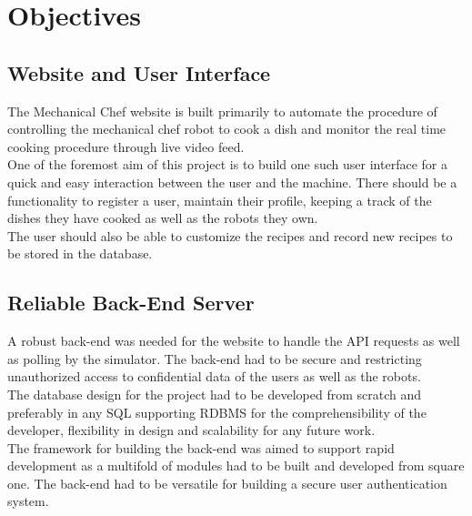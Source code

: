 
\chapter{Objectives}

\section{ Website and User Interface}
{\normalsize The Mechanical Chef website is built primarily to automate the procedure of controlling the mechanical chef robot to cook a dish and monitor the real time cooking procedure through live video feed.\\[0.1in]
One of the foremost aim of this project is to build one such user interface for a quick and easy interaction between the user and the machine. There should be a functionality to register a user, maintain their profile, keeping a track of the dishes they have cooked as well as the robots they own. \\[0.1in]
The user should also be able to customize the recipes and record new recipes to be stored in the database.
}
\section{ Reliable Back-End Server }
{\normalsize A robust back-end was needed for the website to handle the API requests as well as polling by the simulator. The back-end had to be secure and restricting unauthorized access to confidential data of the users as well as the robots. \\[0.1in]
The database design for the project had to be developed from scratch and preferably in any SQL supporting RDBMS for the comprehensibility of the developer, flexibility in design and scalability for any future work. \\[0.1in]
The framework for building the back-end was aimed to support rapid development as a multifold of modules had to be built and developed from square one. The back-end had to be versatile for building a secure user authentication system.
}

